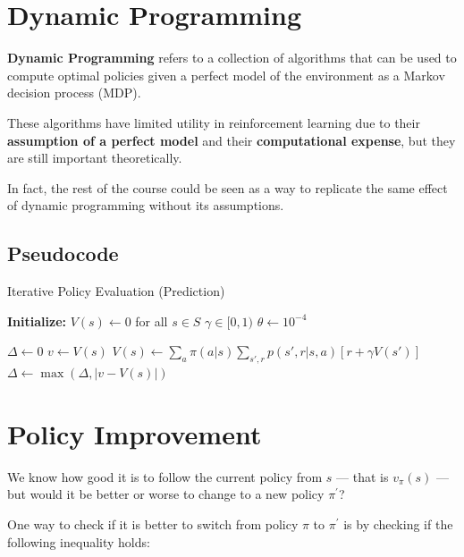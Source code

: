 \documentclass[
  letterpaper,
  DIV=11,
  numbers=noendperiod]{scrreprt}
\begin{document}
\section{Dynamic Programming}\label{dynamic-programming-1}

\textbf{Dynamic Programming} refers to a collection of algorithms that
can be used to compute optimal policies given a perfect model of the
environment as a Markov decision process (MDP).

These algorithms have limited utility in reinforcement learning due to
their \textbf{assumption of a perfect model} and their
\textbf{computational expense}, but they are still important
theoretically.

In fact, the rest of the course could be seen as a way to replicate the
same effect of dynamic programming without its assumptions.

\subsection{Pseudocode}\label{pseudocode-3}

\begin{algorithm}[htb!]
\caption{Iterative Policy Evaluation (Prediction)}
\begin{algorithmic}[1]  %

\State \textbf{Initialize:} 
\State $V(s) \gets 0$ for all $s \in S$
\State $\gamma \in [0,1)$
\State $\theta \gets 10^{-4}$ 

\Repeat
    \State $\Delta \gets 0$
        \State $v \gets V(s)$
        \State $V(s) \gets \sum_{a} \pi(a|s) \sum_{s',r} p(s',r|s,a) \left[ r + \gamma V(s') \right]$
        \State $\Delta \gets \max(\Delta, |v - V(s)|)$
    \EndFor
\Until{$\Delta < \theta$}

\end{algorithmic}
\end{algorithm}

\section{Policy Improvement}\label{policy-improvement}

We know how good it is to follow the current policy from \(s\) --- that
is \(v_{\pi}(s)\) --- but would it be better or worse to change to a new
policy \(\pi^{'}\)?

One way to check if it is better to switch from policy \(\pi\) to
\(\pi^{'}\) is by checking if the following inequality holds:
\end{document}
